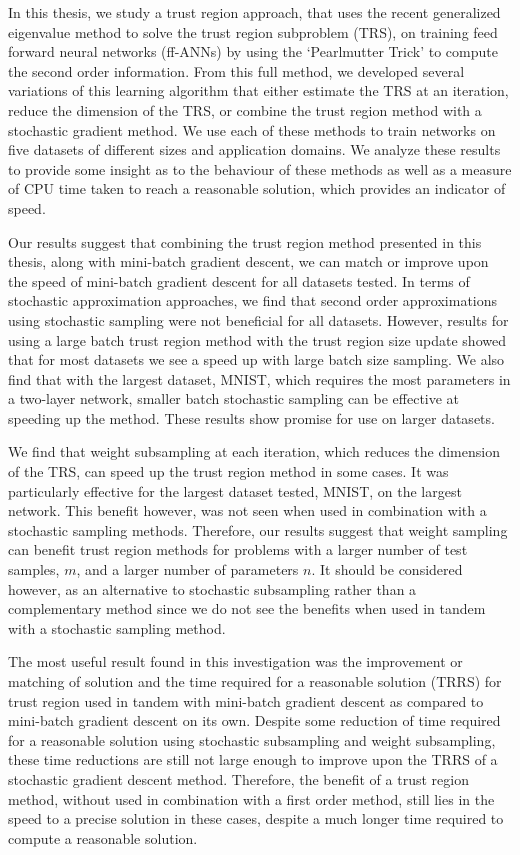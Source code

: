 \documentclass[letterpaper,12pt,titlepage,oneside,final]{book}
\begin{document}
	In this thesis, we study a trust region approach, that uses the recent generalized eigenvalue method to solve the trust region subproblem (TRS), on training feed forward neural networks (ff-ANNs) by using the `Pearlmutter Trick' to compute the second order information. From this full method, we developed several variations of this learning algorithm that either estimate the TRS at an iteration, reduce the dimension of the TRS, or combine the trust region method with a stochastic gradient method. We use each of these methods to train networks on five datasets of different sizes and application domains. We analyze these results to provide some insight as to the behaviour of these methods as well as a measure of CPU time taken to reach a reasonable solution, which provides an indicator of speed.
	
	Our results suggest that combining the trust region method presented in this thesis, along with mini-batch gradient descent, we can match or improve upon the speed of mini-batch gradient descent for all datasets tested. In terms of stochastic approximation approaches, we find that second order approximations using stochastic sampling were not beneficial for all datasets. However, results for using a large batch trust region method with the trust region size update showed that for most datasets we see a speed up with large batch size sampling. We also find that with the largest dataset, MNIST, which requires the most parameters in a two-layer network, smaller batch stochastic sampling can be effective at speeding up the method. These results show promise for use on larger datasets.
	
	We find that weight subsampling at each iteration, which reduces the dimension of the TRS, can speed up the trust region method in some cases. It was particularly effective for the largest dataset tested, MNIST, on the largest network. This benefit however, was not seen when used in combination with a stochastic sampling methods. Therefore, our results suggest that weight sampling can benefit trust region methods for problems with a larger number of test samples, $m$, and a larger number of parameters $n$. It should be considered however, as an alternative to stochastic subsampling rather than a complementary method since we do not see the benefits when used in tandem with a stochastic sampling method.
	
	The most useful result found in this investigation was the improvement or matching of solution and the time required for a reasonable solution (TRRS) for trust region used in tandem with mini-batch gradient descent as compared to mini-batch gradient descent on its own. Despite some reduction of time required for a reasonable solution using stochastic subsampling and weight subsampling, these time reductions are still not large enough to improve upon the TRRS of a stochastic gradient descent method. Therefore, the benefit of a trust region method, without used in combination with a first order method, still lies in the speed to a precise solution in these cases, despite a much longer time required to compute a reasonable solution. 
	
\end{document}
